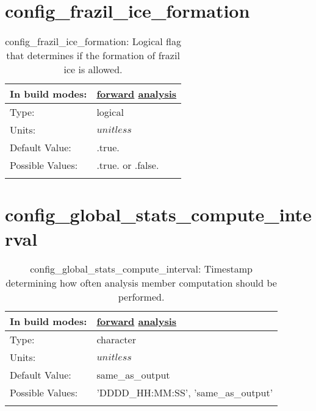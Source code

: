 \section[config\_frazil\_ice\_formation]{config\_frazil\_ice\_formation}
\label{sec:nm_sec_config_frazil_ice_formation}
\begin{center}
\begin{longtable}{| p{2.0in} || p{4.0in} |}
    \hline
    In build modes: & \hyperref[subsec:forward_nm_tab_forcing]{forward} \hyperref[subsec:analysis_nm_tab_forcing]{analysis} \\
    \hline
    Type: & logical \\
    \hline
    Units: & $unitless$ \\
    \hline
    Default Value: & .true. \\
    \hline
    Possible Values: & .true. or .false. \\
    \hline
    \caption{config\_frazil\_ice\_formation: Logical flag that determines if the formation of frazil ice is allowed.}
\end{longtable}
\end{center}
\section[config\_global\_stats\_compute\_interval]{config\_global\_stats\_compute\_interval}
\label{sec:nm_sec_config_global_stats_compute_interval}
\begin{center}
\begin{longtable}{| p{2.0in} || p{4.0in} |}
    \hline
    In build modes: & \hyperref[subsec:forward_nm_tab_global_stats]{forward} \hyperref[subsec:analysis_nm_tab_global_stats]{analysis} \\
    \hline
    Type: & character \\
    \hline
    Units: & $unitless$ \\
    \hline
    Default Value: & same\_as\_output \\
    \hline
    Possible Values: & 'DDDD\_HH:MM:SS', 'same\_as\_output' \\
    \hline
    \caption{config\_global\_stats\_compute\_interval: Timestamp determining how often analysis member computation should be performed.}
\end{longtable}
\end{center}
